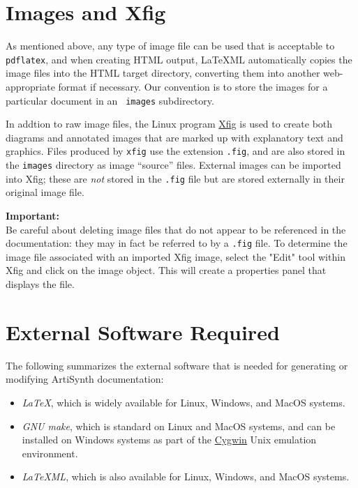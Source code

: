 \documentclass{article}
\begin{document}
\section{Images and Xfig}
\label{ImagesSec}

As mentioned above, any type of image file can be used that is
acceptable to {\tt pdflatex}, and when creating HTML output, LaTeXML
automatically copies the image files into the HTML target directory,
converting them into another web-appropriate format if necessary.  Our
convention is to store the images for a particular document in an {\tt
images} subdirectory.

In addtion to raw image files, the Linux program
\href{http://www.xfig.org}{Xfig} is used to create both diagrams and
annotated images that are marked up with explanatory text and
graphics.  Files produced by {\tt xfig} use the extension {\tt .fig},
and are also stored in the {\tt images} directory as image ``source''
files.  External images can be imported into Xfig; these are {\it not}
stored in the {\tt .fig} file but are stored externally in their
original image file.

\begin{sideblock}
{\bf Important:}\\ Be careful about deleting image files that do not
appear to be referenced in the documentation: they may in fact be
referred to by a {\tt .fig} file.  To determine the image file
associated with an imported Xfig image, select the "Edit" tool within
Xfig and click on the image object.  This will create a properties
panel that displays the file.
\end{sideblock}

\section{External Software Required}
\label{ExternalSoftwareSec}

The following summarizes the external software that
is needed for generating or modifying ArtiSynth
documentation:

\begin{itemize}

\item {\it LaTeX}, which is widely available for Linux, Windows,
and MacOS systems.

\item {\it GNU make}, which is standard on Linux and MacOS systems,
and can be installed on Windows systems as part of the 
\href{http://www.cygwin.com}{Cygwin} Unix emulation environment.

\item {\it LaTeXML}, which is also available for Linux, Windows, and
MacOS systems.  

\end{itemize}
\end{document}
